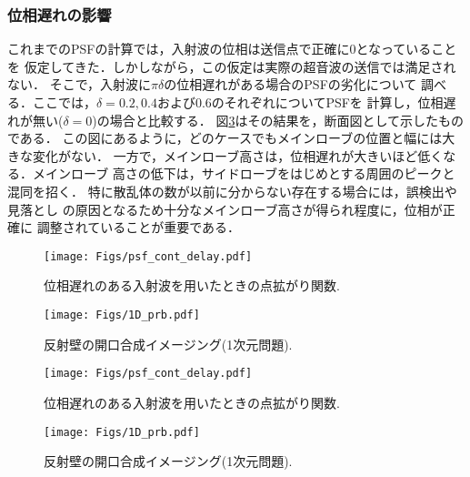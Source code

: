 \subsubsection{位相遅れの影響}
これまでのPSFの計算では，入射波の位相は送信点で正確に0となっていることを
仮定してきた．しかしながら，この仮定は実際の超音波の送信では満足されない．
そこで，入射波に$\pi \delta$の位相遅れがある場合のPSFの劣化について
調べる．ここでは，$\delta=0.2,0.4$および$0.6$のそれぞれについてPSFを
計算し，位相遅れが無い($\delta =0$)の場合と比較する．
図\ref{fig:XXX_psf_cont_delay}はその結果を，断面図として示したものである．
この図にあるように，どのケースでもメインローブの位置と幅には大きな変化がない．
一方で，メインローブ高さは，位相遅れが大きいほど低くなる．メインローブ
高さの低下は，サイドローブをはじめとする周囲のピークと混同を招く．
特に散乱体の数が以前に分からない存在する場合には，誤検出や見落とし
の原因となるため十分なメインローブ高さが得られ程度に，位相が正確に
調整されていることが重要である．
\begin{figure}[h]
	\begin{center}
	\texttt{[image: Figs/psf\_cont\_delay.pdf]} 
	\end{center}
	\caption{位相遅れのある入射波を用いたときの点拡がり関数.} 
	\label{fig:XXX_psf_cont_delay}
\end{figure}
\begin{figure}[h]
	\begin{center}
	\texttt{[image: Figs/1D\_prb.pdf]} 
	\end{center}
	\caption{反射壁の開口合成イメージング(1次元問題).} 
	\label{fig:XXX_1D_prb}
\end{figure}
\begin{figure}[h]
	\begin{center}
	\texttt{[image: Figs/psf\_cont\_delay.pdf]} 
	\end{center}
	\caption{位相遅れのある入射波を用いたときの点拡がり関数.} 
	\label{fig:XXX_psf_cont_delay}
\end{figure}
\begin{figure}[h]
	\begin{center}
	\texttt{[image: Figs/1D\_prb.pdf]} 
	\end{center}
	\caption{反射壁の開口合成イメージング(1次元問題).} 
	\label{fig:XXX_1D_prb}
\end{figure}
